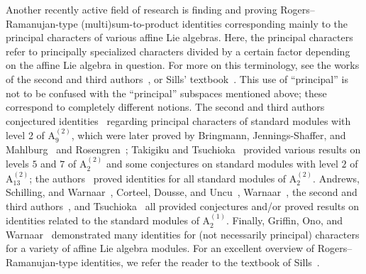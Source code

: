 \documentclass[ALCO,Unicode,published]{cedram}
\begin{document}
Another recently active field of research is finding and proving Rogers--Ramanujan-type (multi)sum-to-product identities corresponding mainly to the principal characters of various affine Lie algebras.
Here, the principal characters refer to principally specialized characters divided by a certain factor depending on the affine Lie algebra in question. 
For more on this terminology, see the works of the second and third authors~\cite{KanRus-a22}, \cite{KanRus-cylindric} or Sills' textbook~\cite{Sil-book}.
This use of ``principal'' is not to be confused with the ``principal'' subspaces mentioned above; these correspond to completely different notions.
The second and third authors conjectured identities~\cite{KanRus-stair} regarding principal characters of standard modules with level 2 of $\mathrm{A}_9^{(2)}$, which were later proved by Bringmann, Jennings-Shaffer, and Mahlburg~\cite{BriJenMah} and Rosengren~\cite{Ros}; Takigiku and Tsuchioka~\cite{TakTsu-a22} provided various results on levels $5$ and $7$ of $\mathrm{A}_2^{(2)}$ and some conjectures on  standard modules with level $2$ of $\mathrm{A}_{13}^{(2)}$;
the authors~\cite{KanRus-a22} proved identities for all standard modules of $\mathrm{A}_2^{(2)}$. Andrews, Schilling, and Warnaar~\cite{ASW}, Corteel, Dousse, and Uncu~\cite{CorDouUnc}, Warnaar~\cite{War2}, the second and third authors~\cite{KanRus-cylindric}, and Tsuchioka~\cite{Tsu-a21level3} all provided conjectures and/or proved results on identities related to the standard modules of $\mathrm{A}_2^{(1)}$.
Finally, Griffin, Ono, and Warnaar~\cite{GriOnoWar} demonstrated  many identities for (not necessarily principal) characters for a variety of affine Lie algebra modules. For an excellent overview of Rogers--Ramanujan-type identities, we refer the reader to the textbook of Sills~\cite{Sil-book}.
\end{document}
